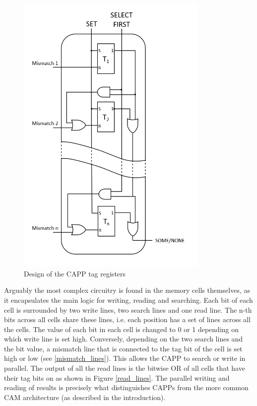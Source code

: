 \begin{figure}
  \includegraphics[height=14cm]{FPGA-CAPP research paper/images/tag_registers.png}
  \caption{Design of the CAPP tag registers}
  \label{tag_registers}
\end{figure}

Arguably the most complex circuitry is found in the memory cells themselves, as it encapsulates the main logic for writing, reading and searching. Each bit of each cell is surrounded by two write lines, two search lines and one read line. The n-th bits across all cells share these lines, i.e. each position has a set of lines across all the cells. The value of each bit in each cell is changed to 0 or 1 depending on which write line is set high. Conversely, depending on the two search lines and the bit value, a mismatch line that is connected to the tag bit of the cell is set high or low  (see \ref{mismatch_lines}). This allows the CAPP to search or write in parallel. The output of all the read lines is the bitwise OR of all cells that have their tag bits on as shown in Figure \ref{read_lines}. The parallel writing and reading of results is precisely what distinguishes CAPPs from the more common CAM architecture (as described in the introduction).

